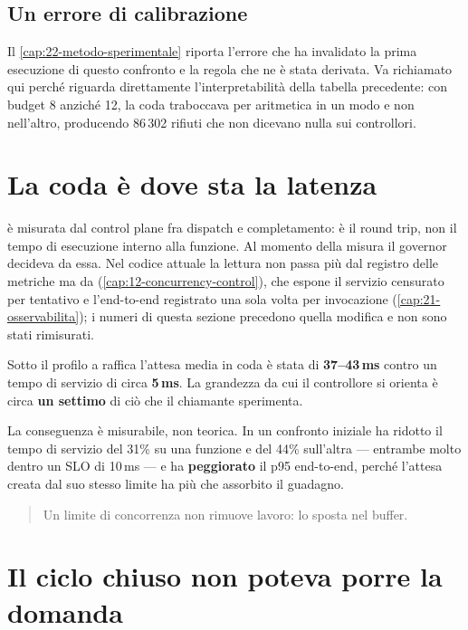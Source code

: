 \subsection{Un errore di calibrazione}

Il \cref{cap:22-metodo-sperimentale} riporta l'errore che ha invalidato la prima
esecuzione di questo confronto e la regola che ne \`e stata derivata. Va
richiamato qui perch\'e riguarda direttamente l'interpretabilit\`a della tabella
precedente: con budget 8 anzich\'e 12, la coda traboccava per aritmetica in un
modo e non nell'altro, producendo 86\,302 rifiuti che non dicevano nulla sui
controllori.

\section{La coda \`e dove sta la latenza}

 \`e misurata dal control plane fra dispatch e
completamento: \`e il round trip, non il tempo di esecuzione interno alla
funzione. Al momento della misura il governor decideva da essa. Nel codice
attuale la lettura non passa pi\`u dal registro delle metriche ma da
 (\cref{cap:12-concurrency-control}), che espone il
servizio censurato per tentativo e l'end-to-end registrato una sola volta per
invocazione (\cref{cap:21-osservabilita}); i numeri di questa sezione
precedono quella modifica e non sono stati rimisurati.

Sotto il profilo a raffica l'attesa media in coda \`e stata di \textbf{37--43\,ms}
contro un tempo di servizio di circa \textbf{5\,ms}. La grandezza da cui il
controllore si orienta \`e circa \textbf{un settimo} di ci\`o che il chiamante
sperimenta.

La conseguenza \`e misurabile, non teorica. In un confronto iniziale
 ha ridotto il tempo di servizio del 31\% su una funzione e del
44\% sull'altra --- entrambe molto dentro un SLO di 10\,ms --- e ha
\textbf{peggiorato} il p95 end-to-end, perch\'e l'attesa creata dal suo stesso
limite ha pi\`u che assorbito il guadagno.

\begin{quote}
Un limite di concorrenza non rimuove lavoro: lo sposta nel buffer.
\end{quote}

\section{Il ciclo chiuso non poteva porre la domanda}

